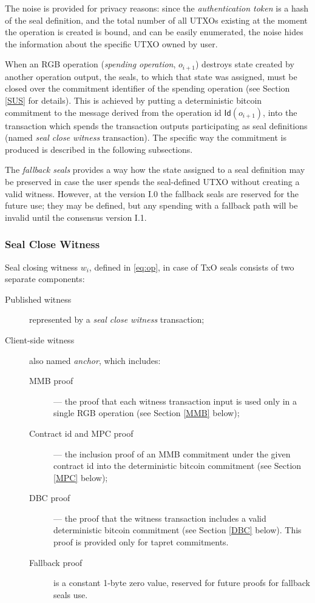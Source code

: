 \documentclass[9pt,oneside]{amsart}
\begin{document}
\begin{multicols}{2}
The noise is provided for privacy reasons:
since the \emph{authentication token} is a hash of the seal definition,
and the total number of all UTXOs existing at the moment the operation is created is bound,
and can be easily enumerated, the noise hides the information about the specific UTXO owned by user.

When an RGB operation (\emph{spending operation}, $o_{i+1}$) destroys state
created by another operation output, the seals, to which that state was assigned,
must be closed over the commitment identifier of the spending operation
(see Section \ref{SUS} for details).
This is achieved by putting a deterministic bitcoin commitment to
the message derived from the operation id $\mathsf{Id}(o_{i+1})$,
into the transaction which spends the transaction outputs participating as seal definitions
(named \emph{seal close witness} transaction).
The specific way the commitment is produced is described in the following subsections.

The \emph{fallback seals} provides a way how the state assigned to a seal definition
may be preserved in case the user spends the seal-defined UTXO without creating a valid witness.
However, at the version I.0 the fallback seals are reserved for the future use;
they may be defined, but any spending with a fallback path will be invalid
until the consensus version I.1.

\subsubsection{Seal Close Witness}\label{Witness}

Seal closing witness $w_i$, defined in \ref{eq:op}, in case of TxO seals consists of two
separate components:
\begin{description}
\item[Published witness] represented by a \emph{seal close witness} transaction;
\item[Client-side witness] also named \emph{anchor},
    which includes:
    \begin{description}
    \item[MMB proof] — the proof that each witness transaction input
        is used only in a single RGB operation (see Section \ref{MMB} below);
    \item[Contract id and MPC proof] — the inclusion proof of an MMB commitment
        under the given contract id into the deterministic bitcoin commitment
        (see Section \ref{MPC} below);
    \item[DBC proof] — the proof that the witness transaction includes
        a valid deterministic bitcoin commitment (see Section \ref{DBC} below).
        This proof is provided only for tapret commitments.
    \item[Fallback proof] is a constant 1-byte zero value,
        reserved for future proofs for fallback seals use.
    \end{description}
\end{description}



\end{multicols}
\end{document}
